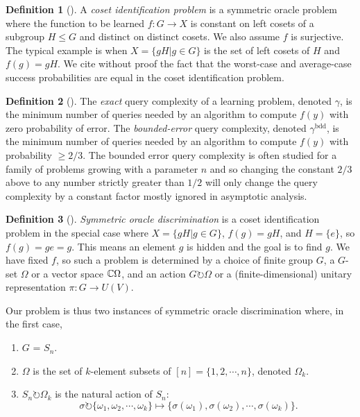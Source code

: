 \documentclass[12pt,twoside]{reedthesis}
\theoremstyle{plain}   %
\theoremstyle{definition}
\newtheorem{defn}{Definition}[section]
\theoremstyle{remark}
\numberwithin{equation}{section}
\def\acts{\circlearrowright} %
\begin{document}
  \begin{defn}[{\cite[Section 2]{copeland}}]
    A \emph{coset identification problem} is a symmetric oracle problem where
    the function to be learned $f: G \to X$ is constant on left cosets of a subgroup $H \leq G$ and distinct on distinct cosets.
    We also assume $f$ is surjective.
    The typical example is when $X = \{gH | g \in G\}$ is the set of left cosets of $H$ and $f(g) = gH$.
    We cite without proof the fact that the worst-case and average-case success probabilities are equal in the coset identification problem.
  \end{defn}
  \begin{defn}[{\cite[Section 2]{copeland}}]
    The \emph{exact}
    query complexity of a learning problem, denoted $\gamma$, is the minimum number of queries needed by an algorithm
    to compute $f (y)$ with zero probability of error. The \emph{bounded-error} query complexity, denoted $\gamma^{\mathrm{bdd}}$, is the minimum
    number of queries needed by an algorithm to compute $f (y)$ with probability $\geq 2/3$. The bounded
    error query complexity is often studied for a family of problems growing with a parameter $n$ and
    so changing the constant $2/3$ above to any number strictly greater than $1/2$ will only change the
    query complexity by a constant factor mostly ignored in asymptotic analysis.
  \end{defn}
  \begin{defn}[{\cite[Section 4]{copeland}}]
    \emph{Symmetric oracle discrimination} is a coset identification problem in the special case where $X = \{gH | g \in G\}$, $f(g) = gH$, and $H = \{e\}$, so $f(g) = g e = g$.
    This means an element $g$ is hidden and the goal is to find $g$.
    We have fixed $f$, so such a problem is determined by a choice of finite group $G$, a $G$-set $\Omega$ or a vector space $\mathbb{C} \Omega$, and an action $G \acts \Omega$ or a (finite-dimensional) unitary representation $\pi: G \to U(V)$.
  \end{defn}
  Our problem is thus two instances of symmetric oracle discrimination where, in the first case,
  \begin{enumerate}
  \item $G$ = $S_n$.
  \item $\Omega$ is the set of $k$-element subsets of $[n] = \{ 1, 2, \cdots, n\}$, denoted $\Omega_k$.
  \item $S_n \acts \Omega_k$ is the natural action of $S_n$:
    \[\sigma \acts \{ \omega_1, \omega_2, \cdots, \omega_k \} \mapsto \{ \sigma(\omega_1), \sigma(\omega_2), \cdots, \sigma(\omega_k)\}.\]
  \end{enumerate}
\end{document}
